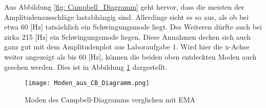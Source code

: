     \noindent
    Aus Abbildung \ref{fig: Campbell_Diagramm} geht hervor, dass die meisten der
    Amplitudenausschläge lastabhängig sind. Allerdings sieht es so aus, als ob bei
    etwa 60 [Hz] tatsächlich ein Schwingungsmode liegt. Des Weiteren dürfte auch
    bei zirka 215 [Hz] ein Schwingungsmode liegen. Diese Annahmen decken sich
    auch ganz gut mit dem Amplitudenplot aus Laboraufgabe 1. Wird hier die
    x-Achse weiter angezeigt als bis 60 [Hz], können die beiden oben entdeckten
    Moden auch gesehen werden. Dies ist in Abbildung
    \ref{fig: Modevergleich_CB_EMA} dargestellt.

    \begin{figure}[H]
        \centering
        \texttt{[image: Moden\_aus\_CB\_Diagramm.png]}
        \caption{Moden des Campbell-Diagramms verglichen mit EMA}
        \label{fig: Modevergleich_CB_EMA}
    \end{figure}


